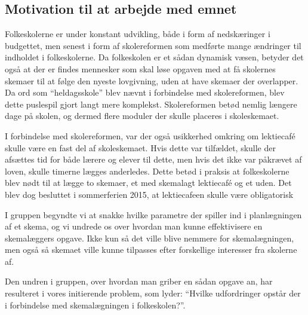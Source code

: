 \subsection{Motivation til at arbejde med emnet}
Folkeskolerne er under konstant udvikling, både i form af nedskæringer i budgettet, men senest i form af skolereformen som medførte mange ændringer til indholdet i folkeskolerne. Da folkeskolen er et sådan dynamisk væsen, betyder det også at der er findes mennesker som skal løse opgaven med at få skolernes skemaer til at følge den nyeste lovgivning, uden at have skemaer der overlapper. Da ord som ``heldagsskole'' blev nævnt i forbindelse med skolereformen, blev dette puslespil gjort langt mere komplekst. Skolereformen betød nemlig længere dage på skolen, og dermed flere moduler der skulle placeres i skoleskemaet.

I forbindelse med skolereformen, var der også usikkerhed omkring om lektiecaf\'e skulle være en fast del af skoleskemaet. Hvis dette var tilfældet, skulle der afsættes tid for både lærere og elever til dette, men hvis det ikke var påkrævet af loven, skulle timerne lægges anderledes. Dette betød i praksis at folkeskolerne blev nødt til at lægge to skemaer, et med skemalagt lektiecaf\'e og et uden. Det blev dog besluttet i sommerferien 2015, at lektiecafeen skulle være obligatorisk\cite{Lektiecafe} 

I gruppen begyndte vi at snakke hvilke parametre der spiller ind i planlægningen af et skema, og vi undrede os over hvordan man kunne effektivisere en skemalæggers opgave. Ikke kun så det ville blive nemmere for skemalægningen, men også så skemaet ville kunne tilpasses efter forskellige interesser fra skolerne af.

Den undren i gruppen, over hvordan man griber en sådan opgave an, har resulteret i vores initierende problem, som lyder: ``Hvilke udfordringer opstår der i forbindelse med skemalægningen i folkeskolen?''.

